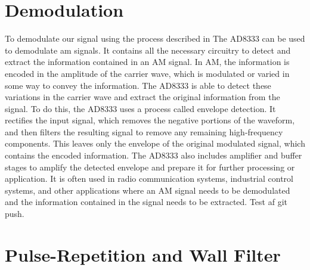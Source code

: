 \section{Demodulation}
To demodulate our signal using the process described in The AD8333\cite{AD8333} can be used to demodulate \gls{am} signals. It contains all the necessary circuitry to detect and extract the information contained in an AM signal. In AM, the information is encoded in the amplitude of the carrier wave, which is modulated or varied in some way to convey the information. The AD8333 is able to detect these variations in the carrier wave and extract the original information from the signal. To do this, the AD8333 uses a process called envelope detection. It rectifies the input signal, which removes the negative portions of the waveform, and then filters the resulting signal to remove any remaining high-frequency components. This leaves only the envelope of the original modulated signal, which contains the encoded information. The AD8333 also includes amplifier and buffer stages to amplify the detected envelope and prepare it for further processing or application. It is often used in radio communication systems, industrial control systems, and other applications where an AM signal needs to be demodulated and the information contained in the signal needs to be extracted. Test af git push.

\section{Pulse-Repetition and Wall Filter}
